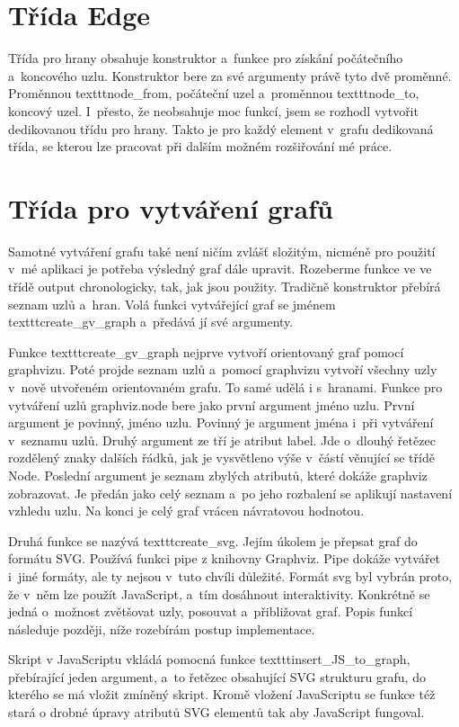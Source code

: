 \documentclass[color,table,oneside,nolot,nolof]{fithesis}
\begin{document}
\section{Třída Edge}
	Třída pro hrany obsahuje konstruktor a~funkce pro získání počátečního a~koncového uzlu. Konstruktor bere za své argumenty právě tyto dvě 
	proměnné. Proměnnou texttt{node\_from}, počáteční uzel a~proměnnou texttt{node\_to}, koncový uzel. I~přesto, že neobsahuje moc funkcí, jsem se rozhodl vytvořit dedikovanou třídu pro hrany. 
	Takto je pro každý element v~grafu dedikovaná třída, se kterou lze pracovat při dalším možném rozšiřování mé práce.

\section{Třída pro vytváření grafů}
	Samotné vytváření grafu také není ničím zvlášť složitým, nicméně pro použití v~mé aplikaci je potřeba výsledný graf dále upravit. Rozeberme funkce ve ve třídě output chronologicky,
	tak, jak jsou použity. Tradičně konstruktor přebírá seznam uzlů a~hran. Volá funkci vytvářející graf se jménem texttt{create\_gv\_graph} a~předává jí své argumenty. 

	Funkce texttt{create\_gv\_graph} nejprve vytvoří orientovaný graf pomocí graphvizu. Poté projde seznam uzlů a~pomocí graphvizu vytvoří všechny uzly v~nově utvořeném orientovaném grafu. To samé udělá i
	s~hranami. Funkce pro vytváření uzlů graphviz.node bere jako první argument jméno uzlu. První argument je povinný, jméno uzlu. Povinný je argument jména
	i~při vytváření v~seznamu uzlů. Druhý argument ze tří je atribut label. Jde o~dlouhý řetězec rozdělený znaky dalších řádků, jak je vysvětleno výše v~částí věnující se třídě Node.
	Poslední argument je seznam zbylých atributů, které dokáže graphviz zobrazovat. Je předán jako celý seznam a~po jeho rozbalení se aplikují nastavení vzhledu uzlu. Na konci je celý
	graf vrácen návratovou hodnotou.

	Druhá funkce se nazývá texttt{create\_svg}. Jejím úkolem je přepsat graf do formátu SVG. Používá funkci pipe z knihovny Graphviz. Pipe dokáže vytvářet i~jiné formáty, ale ty nejsou v~tuto
	chvíli důležité. Formát svg byl vybrán proto, že v~něm lze použít JavaScript, a~tím dosáhnout interaktivity. Konkrétně se jedná o~možnost zvětšovat uzly, posouvat a~přibližovat graf.
	Popis funkcí následuje později, níže rozebírám postup implementace.

	Skript v JavaScriptu vkládá pomocná funkce texttt{insert\_JS\_to\_graph}, přebírající jeden argument, a~to řetězec obsahující SVG strukturu grafu, do kterého se má vložit zmíněný skript. 
	Kromě vložení JavaScriptu se funkce též stará o drobné úpravy atributů SVG elementů tak aby JavaScript fungoval. 
\end{document}

